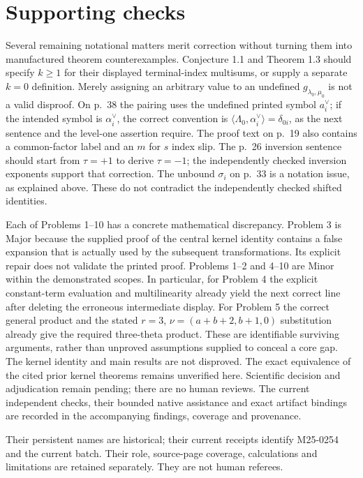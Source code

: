 \documentclass[10pt]{article}
\begin{document}
\section*{Supporting checks}
Several remaining notational matters merit correction without turning them into manufactured theorem counterexamples. Conjecture 1.1 and Theorem 1.3 should specify \(k\ge1\) for their displayed terminal-index multisums, or supply a separate \(k=0\) definition. Merely assigning an arbitrary value to an undefined \(g_{\lambda_0,\mu_0}\) is not a valid disproof. On p. 38 the pairing uses the undefined printed symbol \(a_i^\vee\); if the intended symbol is \(\alpha_i^\vee\), the correct convention is \(\langle\Lambda_0,\alpha_i^\vee\rangle=\delta_{0i}\), as the next sentence and the level-one assertion require. The proof text on p. 19 also contains a common-factor label and an \(m\) for \(s\) index slip. The p. 26 inversion sentence should start from \(\tau=+1\) to derive \(\tau=-1\); the independently checked inversion exponents support that correction. The unbound \(\sigma_i\) on p. 33 is a notation issue, as explained above. These do not contradict the independently checked shifted identities.\par
Each of Problems 1–10 has a concrete mathematical discrepancy. Problem 3 is Major because the supplied proof of the central kernel identity contains a false expansion that is actually used by the subsequent transformations. Its explicit repair does not validate the printed proof. Problems 1–2 and 4–10 are Minor within the demonstrated scopes. In particular, for Problem 4 the explicit constant-term evaluation and multilinearity already yield the next correct line after deleting the erroneous intermediate display. For Problem 5 the correct general product and the stated \(r=3\), \(\nu=(a+b+2,b+1,0)\) substitution already give the required three-theta product. These are identifiable surviving arguments, rather than unproved assumptions supplied to conceal a core gap. The kernel identity and main results are not disproved. The exact equivalence of the cited prior kernel theorems remains unverified here. Scientific decision and adjudication remain pending; there are no human reviews. The current independent checks, their bounded native assistance and exact artifact bindings are recorded in the accompanying findings, coverage and provenance.\par
Their persistent names are historical; their current receipts identify M25-0254 and the current batch. Their role, source-page coverage, calculations and limitations are retained separately. They are not human referees.\par
\end{document}
